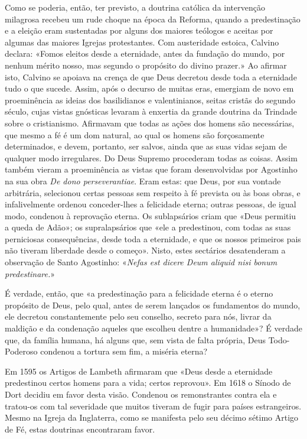 \documentclass[11pt,a5paper,twoside,openany]{book}
\begin{document}
Como se poderia, então, ter previsto, a doutrina católica da intervenção milagrosa recebeu um rude choque na época da Reforma, quando a predestinação e a eleição eram sustentadas por alguns dos maiores teólogos e aceitas por algumas das maiores Igrejas protestantes. Com austeridade estoica, Calvino declara: «Fomos eleitos desde a eternidade, antes da fundação do mundo, por nenhum mérito nosso, mas segundo o propósito do divino prazer.» Ao afirmar isto, Calvino se apoiava na crença de que Deus decretou desde toda a eternidade tudo o que sucede. Assim, após o decurso de muitas eras, emergiam de novo em proeminência as ideias dos basilidianos e valentinianos, seitas cristãs do segundo século, cujas vistas gnósticas levaram à enxertia da grande doutrina da Trindade sobre o cristianismo. Afirmavam que todas as ações dos homens são necessárias, que mesmo a fé é um dom natural, ao qual os homens são forçosamente determinados, e devem, portanto, ser salvos, ainda que as suas vidas sejam de qualquer modo irregulares. Do Deus Supremo procederam todas as coisas. Assim também vieram a proeminência as vistas que foram desenvolvidas por Agostinho na sua obra \textit{De dono perseverantiae}. Eram estas: que Deus, por sua vontade arbitrária, selecionou certas pessoas sem respeito à fé prevista ou às boas obras, e infalivelmente ordenou conceder-lhes a felicidade eterna; outras pessoas, de igual modo, condenou à reprovação eterna. Os sublapsários criam que «Deus permitiu a queda de Adão»; os supralapsários que «ele a predestinou, com todas as suas perniciosas consequências, desde toda a eternidade, e que os nossos primeiros pais não tiveram liberdade desde o começo». Nisto, estes sectários desatenderam a observação de Santo Agostinho: «\textit{Nefas est dicere Deum aliquid nisi bonum predestinare.}»

É verdade, então, que «a predestinação para a felicidade eterna é o eterno propósito de Deus, pelo qual, antes de serem lançados os fundamentos do mundo, ele decretou constantemente pelo seu conselho, secreto para nós, livrar da maldição e da condenação aqueles que escolheu dentre a humanidade»? É verdade que, da família humana, há alguns que, sem vista de falta própria, Deus Todo-Poderoso condenou a tortura sem fim, a miséria eterna?

Em 1595 os Artigos de Lambeth afirmaram que «Deus desde a eternidade predestinou certos homens para a vida; certos reprovou». Em 1618 o Sínodo de Dort decidiu em favor desta visão. Condenou os remonstrantes contra ela e tratou-os com tal severidade que muitos tiveram de fugir para países estrangeiros. Mesmo na Igreja da Inglaterra, como se manifesta pelo seu décimo sétimo Artigo de Fé, estas doutrinas encontraram favor.
\end{document}

